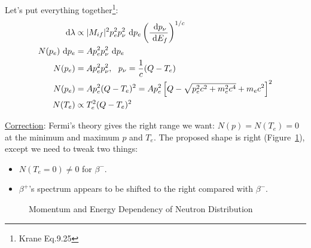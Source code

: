 \documentclass{school-22.101-notes}
\begin{document}
Let's put everything together\footnote{Krane Eq.9.25}: 
\begin{align}
\mbox{ }\mathrm{d} \lambda &\propto |M_{if}|^2 p_{e}^2 p_{\nu}^2 \mbox{ }\mathrm{d} p_{e} \left(\frac{\mbox{ }\mathrm{d} p_{\nu}}{\mbox{ }\mathrm{d} E_f} \right)^{1/c} \\
N(p_{e}) \mbox{ }\mathrm{d} p_{e} &= A p_{e}^2 p_{\nu}^2 \mbox{ }\mathrm{d} p_{e} \\
N(p_{e}) &= A p_{e}^2 p_{\nu}^2, \mbox{ } \mbox{ } p_{\nu} =\frac{1}{c} (Q - T_{e}) \\
N(p_{e}) &= A p_{e}^2 (Q - T_{e})^2  = A p_{e}^2 \left[ Q - \sqrt{p_{e}^2 c^2 + m_e^2 c^4} + m_e c^2 \right]^2 \\
N(T_{e}) &\propto T_{e}^2 (Q - T_{e})^2
\end{align}

\uline{Correction}: Fermi's theory gives the right range we want: $N(p) = N(T_e) = 0$ at the minimum and maximum $p$ and $T_e$. The proposed shape is right (Figure~\ref{distribution}), except we need to tweak two things: 
\begin{itemize}
\item $N(T_e = 0) \neq 0$ for $\beta^-$. 
\item $\beta^+$'s spectrum appears to be shifted to the right compared with $\beta^-$. 
\end{itemize} 
\begin{figure}
  \centering
  \caption{Momentum and Energy Dependency of Neutron Distribution}  \label{distribution}
\end{figure}
\end{document}
